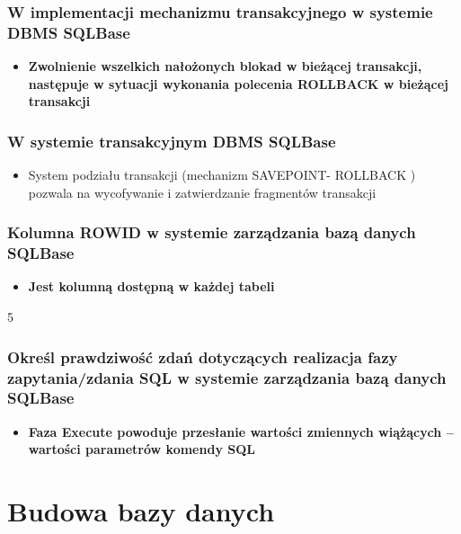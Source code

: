 \documentclass[a4paper,twoside]{article}
\begin{document}
  	\section{W implementacji mechanizmu transakcyjnego w systemie DBMS SQLBase}
  	\begin{itemize}
  		\item \textbf{Zwolnienie wszelkich nałożonych blokad w bieżącej transakcji, następuje w sytuacji wykonania polecenia ROLLBACK w bieżącej transakcji}
  	\end{itemize}
  	
  	\section{W systemie transakcyjnym DBMS SQLBase}
  	\begin{itemize}
  		\item System podziału transakcji (mechanizm SAVEPOINT- ROLLBACK ) pozwala na wycofywanie i zatwierdzanie fragmentów transakcji
  	\end{itemize}
  	
  	\section{Kolumna ROWID w systemie zarządzania bazą danych SQLBase}
  	\begin{itemize}
  		\item \textbf{Jest kolumną dostępną w każdej tabeli}
  	\end{itemize}5
  	
  	\section{Określ prawdziwość zdań dotyczących realizacja fazy zapytania/zdania SQL w systemie zarządzania bazą danych SQLBase}
  	\begin{itemize}
  		\item \textbf{Faza Execute powoduje przesłanie wartości zmiennych wiążących – wartości parametrów komendy SQL}
  	\end{itemize}
  	
  	
  	\part*{Budowa bazy danych}
\end{document}

